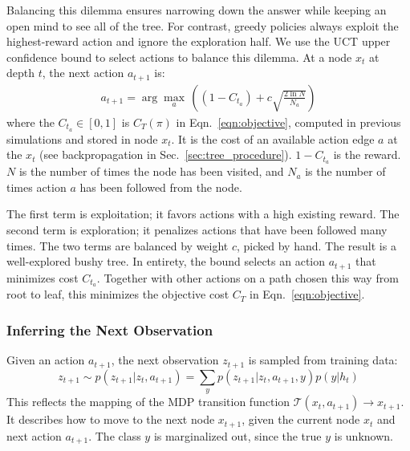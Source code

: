 \documentclass[letterpaper, 10 pt, conference]{ieeeconf}  %
\begin{document}
Balancing this dilemma ensures narrowing down the answer while keeping an open mind to see all of the tree.
For contrast, greedy policies %
always exploit the highest-reward action and ignore the exploration half.
%
We use the UCT \cite{uct} upper confidence bound to select actions to balance this dilemma.
At a node $x_t$ at depth $t$, the next action $a_{t+1}$ is:
\begin{align}
a_{t+1} = \arg\max_a \, \left( (1-C_{t_a}) + c \sqrt{ \frac{2 \ln N}{N_a}} \right)
\label{eqn:ucb1}
\end{align}
where the $C_{t_a} \in [0, 1]$ is $C_T(\pi)$ in Eqn.~\ref{eqn:objective}, computed in previous simulations and stored in node $x_t$. It is the cost of an available action edge $a$ at the $x_t$ (see backpropagation in Sec.~\ref{sec:tree_procedure}). $1-C_{t_a}$ is the reward.
$N$ is the number of times the node has been visited, and $N_a$ is the number of times action $a$ has been followed from the node. 

The first term is exploitation; it favors actions with a high existing reward. The second term is exploration; it penalizes actions that have been followed many times. The two terms are balanced by weight $c$, picked by hand. The result is a well-explored bushy tree.
In entirety, the bound selects an action $a_{t+1}$ that minimizes cost $C_{t_a}$. Together with other actions on a path chosen this way from root to leaf, this minimizes the objective cost $C_T$ in Eqn.~\ref{eqn:objective}.


\subsubsection{Inferring the Next Observation} %

Given an action $a_{t+1}$, the next
observation $z_{t+1}$ is sampled from training data: 
\begin{equation}
  \label{eqn:observ}
  z_{t+1} \!\sim\! p(z_{t+1} | z_t, a_{t+1})
  \!=\!\! \sum_y p(z_{t+1} | z_t, a_{t+1}, y) p(y | h_t)
\end{equation}
This reflects the mapping of the MDP transition function $\mathcal{T}(x_t, a_{t+1}) \rightarrow x_{t+1}$. It describes how to move to the next node $x_{t+1}$, given the current node $x_t$ and next action $a_{t+1}$.
The class $y$ is marginalized out, since the true $y$ is unknown.
\end{document}
